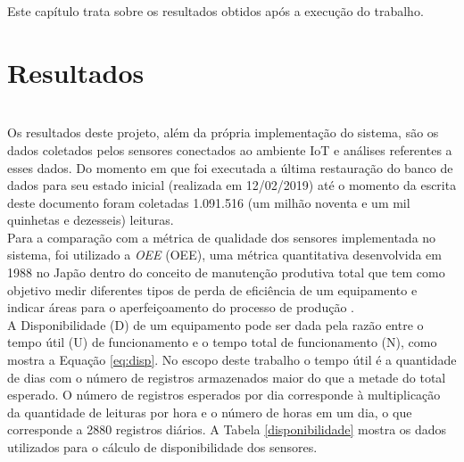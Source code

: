
\quad Este capítulo trata sobre os resultados obtidos após a execução do trabalho.

\section{Resultados}
\\\null \quad Os resultados deste projeto, além da própria implementação do sistema, são os dados coletados pelos sensores conectados ao ambiente \acrshort{IoT} e análises referentes a esses dados.
 Do momento em que foi executada a última restauração do banco de dados para seu estado inicial (realizada em 12/02/2019) até o momento da escrita deste documento foram coletadas 1.091.516 (um milhão noventa e um mil quinhetas e dezesseis) leituras.
\\\null \quad Para a comparação com a métrica de qualidade dos sensores implementada no sistema, foi utilizado a \textit{\acrlong{OEE}} (\acrshort{OEE}), uma métrica quantitativa desenvolvida em 1988 no Japão dentro do conceito de manutenção produtiva total que tem como objetivo medir diferentes tipos de perda de eficiência de um equipamento e indicar áreas para o aperfeiçoamento do processo de produção \cite{artigoOEE}.
\\\null \quad A Disponibilidade (D) de um equipamento pode ser dada pela razão entre o tempo útil (U) de funcionamento e o tempo total de funcionamento (N), como mostra a Equação \ref{eq:disp}. No escopo deste trabalho o tempo útil é a quantidade de dias com o número de registros armazenados maior do que a metade do total esperado. O número de registros esperados por dia corresponde à multiplicação da quantidade de leituras por hora e o número de horas em um dia, o que corresponde a 2880 registros diários. A Tabela \ref{disponibilidade} mostra os dados utilizados para o cálculo de disponibilidade dos sensores.

